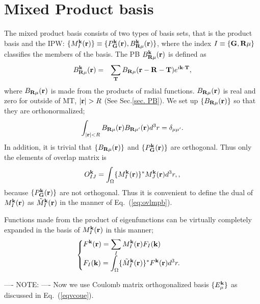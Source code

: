 \documentclass[a4paper,10pt,fleqn]{article}
\newcommand{\bfk}{{\bf k}}
\newcommand{\bfR}{{\bf R}}
\newcommand{\req}[1]{\mbox{Eq.~(\ref{#1})}}
\begin{document}
\section{Mixed Product basis}
\label{sec:mpbsec}
The mixed product basis consists of two types of basis sets, that is 
the product basis and the IPW:
$\{M^{\bf k}_I({\bf r}) \}\equiv 
\{ P^{\bf k}_{\bf G}({\bf r}), B_{\bfR\mu}^{\bf k}({\bf r})\}$,
where the index $I\equiv \{ {\bf G},\bfR\mu\}$ 
classifies the members of the basis.
The PB $B^{\bf k}_{\bfR\mu}({\bf r})$ is defined as
\begin{eqnarray}
  B^{\bf k}_{\bfR\mu}({\bf r}) &=& 
          \sum_{\bf T} B_{\bfR\mu}({\bf r-R}-{\bf T}) e^{i {\bf k\cdot T}},
\end{eqnarray}
where $B_{\bfR\mu}({\bf r})$ is made from the products of radial functions.
$B_{\bfR\mu}({\bf r})$ is real and
zero for outside of MT, $|{\bf r}| > R$ (See Sec.\ref{sec. PB}).
We set up $\{B_{\bfR\mu}({\bf r})\}$ so that they are orthonormalized;
\begin{eqnarray}
  \int_{|{\bf r}| < R} B_{\bfR\mu}({\bf r}) B_{\bfR\mu'}({\bf r}) d^3r =
  \delta_{\mu \mu'}.
  \label{eq. PB-ortho}
\end{eqnarray}
In addition, it is trivial that $\{B_{\bfR\mu}({\bf r})\}$ and 
$\{ P^{\bf k}_{\bf G}({\bf r})\}$ are orthogonal.
Thus only the elements of overlap matrix is
\begin{eqnarray}
 O^{\bf k}_{IJ}= 
  \int_\Omega \{M_I^{\bf k}({\bf r})\}^* {M}_J^{\bf k}({\bf r}) d^3r,
  \label{eq. ovlp},
\end{eqnarray}
because $\{ P^{\bf k}_{\bf G}({\bf r})\}$
are not orthogonal.
Thus it is convenient to define the dual of ${M}^{\bf k}_{I}({\bf r})$ as
$\tilde{M}^{\bf k}_{I}({\bf r})$ in the manner of \req{eq:ovlmpb}.

Functions made from the product of eigenfunctions can be
virtually completely expanded in the basis of ${M}^{\bf k}_{I}({\bf r})$
in this manner;
\begin{eqnarray}
\begin{cases}
  \displaystyle 
  F^{\bf k}({\bf r}) = \sum_I M_I^{\bf k} ({\bf r}) F_I({\bf k}) & \cr
  \displaystyle
  F_I({\bf k}) = 
  \int_\Omega \{\tilde{M}_I^{\bf k}({\bf r})\}^* 
  F^{\bf k}({\bf r}) d^3r.
\end{cases}
  \label{expandfk}
\end{eqnarray}

---- NOTE: ----
Now we use Coulomb matrix orthogonalized basis $\{E^\bfk_\mu\}$ as
discussed in \req{eqvcoue}.
\end{document}
